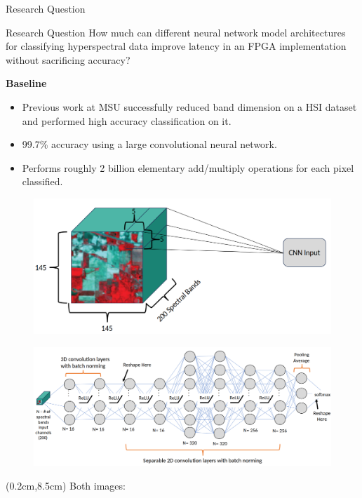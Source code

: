 \documentclass[aspectratio=169,xcolor=dvipsnames]{beamer}
\newcommand\myheading[1]{%
  \par\bigskip
  {\Large\bfseries#1}\par\smallskip}
\begin{document}
\begin{frame}{Research Question}
    \begin{alertblock}{Research Question}
        How much can different neural network model architectures for classifying hyperspectral data improve latency in an FPGA implementation without sacrificing accuracy?
    \end{alertblock}
    \myheading{Baseline}
    \begin{itemize}
        \item Previous work at MSU successfully reduced band dimension on a HSI dataset and performed high accuracy classification on it.
        \item 99.7\% accuracy using a large convolutional neural network.
        \item Performs roughly 2 billion elementary add/multiply operations for each pixel classified.
    \end{itemize}
\end{frame}

\begin{frame}
    \begin{figure}
        \includegraphics[width=0.5\linewidth]{cnn_data.png}
    \end{figure}

    \begin{figure}
        \includegraphics[width=0.8\linewidth]{cnn_arch.png} 
    \end{figure}

    \begin{textblock*}{5cm}(0.2cm,8.5cm)
        \tiny Both images: \cite{dirk-presentation}
    \end{textblock*}

\end{frame}
\end{document}
